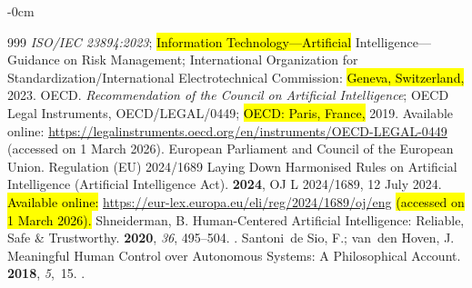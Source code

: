 \documentclass[mca,article,accept,pdftex,oneauthor]{Definitions/mdpi}
\begin{document}
\begin{adjustwidth}{-\extralength}{0cm}
\begin{thebibliography}{999}
\emph{ISO/IEC 23894:2023};
\newblock \hl{Information Technology---Artificial} %
 Intelligence---Guidance on Risk Management;
\newblock International Organization for Standardization/International
  Electrotechnical Commission: \hl{Geneva, Switzerland,} 2023.
{OECD}.
\newblock \emph{Recommendation of the Council on Artificial Intelligence};
\newblock OECD Legal Instruments, OECD/LEGAL/0449; \hl{OECD: Paris, France,} 2019.
\newblock Available online: {\url{https://legalinstruments.oecd.org/en/instruments/OECD-LEGAL-0449}}
(accessed on 1 March 2026).
{European Parliament and Council of the European Union}.
\newblock Regulation (EU) 2024/1689 Laying Down Harmonised Rules on Artificial
  Intelligence ({Artificial Intelligence Act}).
 {\bf 2024}, OJ L 2024/1689, 12 July 2024.
\newblock \hl{Available online:} %
{\url{https://eur-lex.europa.eu/eli/reg/2024/1689/oj/eng}} \hl{(accessed on 1 March 2026).} %
Shneiderman, B.
\newblock Human-Centered Artificial Intelligence: Reliable, Safe \&
  Trustworthy.
 {\bf 2020}, {\em 36}, 495--504.
.
Santoni~de Sio, F.; van~den Hoven, J.
\newblock Meaningful Human Control over Autonomous Systems: A Philosophical
  Account.
 {\bf 2018}, {\em 5},~15.
.


\end{thebibliography}
\end{adjustwidth}
\end{document}
